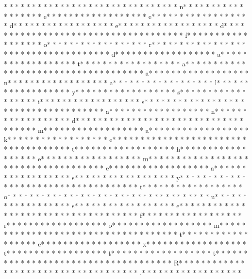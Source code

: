 *  * * *  *  * * *  *  * * *  *  * * *  * * *  * * *  *  * * *  *  * * *  * n* * *  * * *  * * *  *  * * *  *  * * *  * e* * *  * * *  * * *  *  * * *  *  * * *  * e* * *  * * *  * * *  *  * * *  *  * * *  * d* * *  * * *  * * *  *  * * *  *  * * *  * e* * *  * * *  * * *  *  * * *  *  * * *  * d* * *  * * *  * * *  *  * * *  *  * * *  *  * * *  * * *  * * *  *  * * *  *  * * *  * f* * *  * * *  * * *  *  * * *  *  * * *  * o* * *  * * *  * * *  *  * * *  *  * * *  * r* * *  * * *  * * *  *  * * *  *  * * *  *  * * *  * * *  * * *  *  * * *  *  * * *  * d* * *  * * *  * * *  *  * * *  *  * * *  * a* * *  * * *  * * *  *  * * *  *  * * *  * t* * *  * * *  * * *  *  * * *  *  * * *  * a* * *  * * *  * * *  *  * * *  *  * * *  *  * * *  * * *  * * *  *  * * *  *  * * *  * a* * *  * * *  * * *  *  * * *  *  * * *  * n* * *  * * *  * * *  *  * * *  *  * * *  * a* * *  * * *  * * *  *  * * *  *  * * *  * l* * *  * * *  * * *  *  * * *  *  * * *  * y* * *  * * *  * * *  *  * * *  *  * * *  * s* * *  * * *  * * *  *  * * *  *  * * *  * i* * *  * * *  * * *  *  * * *  *  * * *  * s* * *  * * *  * * *  *  * * *  *  * * *  *  * * *  * * *  * * *  *  * * *  *  * * *  * a* * *  * * *  * * *  *  * * *  *  * * *  * n* * *  * * *  * * *  *  * * *  *  * * *  * d* * *  * * *  * * *  *  * * *  *  * * *  *  * * *  * * *  * * *  *  * * *  *  * * *  * m* * *  * * *  * * *  *  * * *  *  * * *  * a* * *  * * *  * * *  *  * * *  *  * * *  * k* * *  * * *  * * *  *  * * *  *  * * *  * e* * *  * * *  * * *  *  * * *  *  * * *  *  * * *  * * *  * * *  *  * * *  *  * * *  * t* * *  * * *  * * *  *  * * *  *  * * *  * h* * *  * * *  * * *  *  * * *  *  * * *  * e* * *  * * *  * * *  *  * * *  *  * * *  * m* * *  * * *  * * *  *  * * *  *  * * *  *  * * *  * * *  * * *  *  * * *  *  * * *  * e* * *  * * *  * * *  *  * * *  *  * * *  * a* * *  * * *  * * *  *  * * *  *  * * *  * s* * *  * * *  * * *  *  * * *  *  * * *  * y* * *  * * *  * * *  *  * * *  *  * * *  *  * * *  * * *  * * *  *  * * *  *  * * *  * t* * *  * * *  * * *  *  * * *  *  * * *  * o* * *  * * *  * * *  *  * * *  *  * * *  *  * * *  * * *  * * *  *  * * *  *  * * *  * u* * *  * * *  * * *  *  * * *  *  * * *  * s* * *  * * *  * * *  *  * * *  *  * * *  * e* * *  * * *  * * *  *  * * *  *  * * *  *  * * *  * * *  * * *  *  * * *  *  * * *  * f* * *  * * *  * * *  *  * * *  *  * * *  * r* * *  * * *  * * *  *  * * *  *  * * *  * o* * *  * * *  * * *  *  * * *  *  * * *  * m* * *  * * *  * * *  *  * * *  *  * * *  *  * * *  * * *  * * *  *  * * *  *  * * *  * t* * *  * * *  * * *  *  * * *  *  * * *  * e* * *  * * *  * * *  *  * * *  *  * * *  * x* * *  * * *  * * *  *  * * *  *  * * *  * t* * *  * * *  * * *  *  * * *  *  * * *  * t* * *  * * *  * * *  *  * * *  *  * * *  * t* * *  * * *  * * *  *  * * *  *  * * *  * {* * *  * * *  * * *  *  * * *  *  * * *  * R* * *  * * *  * * *  *  * * *  *  * * *  * }* * *  * * *  * * *  *  * * *  *  * * *  * .* * *  * * *  * * *  *  * * *  *  * * *  * 
